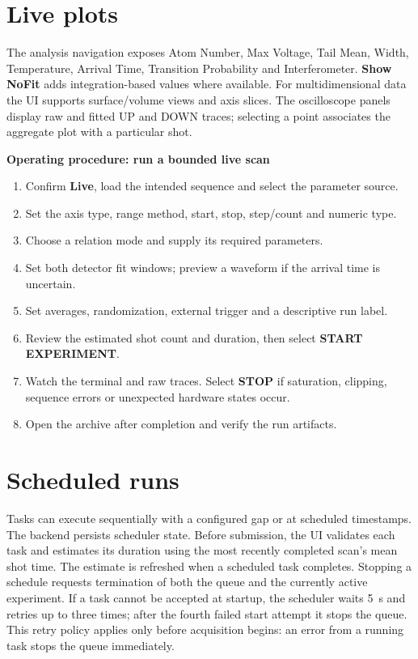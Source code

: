 \documentclass[11pt,oneside,openany]{book}
\newcommand{\ui}[1]{\textbf{#1}}
\newenvironment{procedure}[1]
  {\par\medskip\noindent\textbf{Operating procedure: #1}\par\smallskip\begin{enumerate}}
  {\end{enumerate}\medskip}
\begin{document}
\section{Live plots}
The analysis navigation exposes Atom Number, Max Voltage, Tail Mean, Width,
Temperature, Arrival Time, Transition Probability and Interferometer. \ui{Show NoFit}
adds integration-based values where available. For multidimensional data the UI supports
surface/volume views and axis slices. The oscilloscope panels display raw and fitted UP
and DOWN traces; selecting a point associates the aggregate plot with a particular shot.

\begin{procedure}{run a bounded live scan}
  \item Confirm \ui{Live}, load the intended sequence and select the parameter source.
  \item Set the axis type, range method, start, stop, step/count and numeric type.
  \item Choose a relation mode and supply its required parameters.
  \item Set both detector fit windows; preview a waveform if the arrival time is uncertain.
  \item Set averages, randomization, external trigger and a descriptive run label.
  \item Review the estimated shot count and duration, then select \ui{START EXPERIMENT}.
  \item Watch the terminal and raw traces. Select \ui{STOP} if saturation, clipping,
  sequence errors or unexpected hardware states occur.
  \item Open the archive after completion and verify the run artifacts.
\end{procedure}

\section{Scheduled runs}
Tasks can execute sequentially with a configured gap or at scheduled timestamps. The
backend persists scheduler state. Before submission, the UI validates each task and
estimates its duration using the most recently completed scan's mean shot time. The
estimate is refreshed when a scheduled task completes. Stopping a schedule requests
termination of both the queue and the currently active experiment. If a task cannot be
accepted at startup, the scheduler waits \SI{5}{\second} and retries up to three times;
after the fourth failed start attempt it stops the queue. This retry policy applies only
before acquisition begins: an error from a running task stops the queue immediately.
\end{document}
